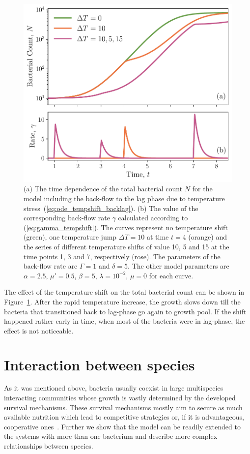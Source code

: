\documentclass[10pt,A4paper]{article}
\numberwithin{equation}{section}
\begin{document}
\begin{figure}[t]
    \begin{center}
    \includegraphics[width=0.9\columnwidth]{Figures/pool_model_3pools_resource_tempshift.pdf}
    \caption{
        (a) The time dependence of the total bacterial count $N$ for the model including the back-flow to the lag phase due to temperature stress~(\ref{eq:ode_tempshift_backlag}).
        (b) The value of the corresponding back-flow rate $\gamma$ calculated according to (\ref{eq:gamma_tempshift}).
        The curves represent no temperature shift (green), one temperature jump $\Delta T = 10$ at time $t=4$ (orange)
        and the series of different temperature shifts of value 10, 5 and 15 at the time points 1, 3 and 7, respectively (rose).
        The parameters of the back-flow rate are $\Gamma=1$ and $\delta=5$.
        The other model parameters are $\alpha=2.5$, $\mu'=0.5$, $\beta=5$, $\lambda=10^{-2}$, $\mu = 0$ for each curve.
    }
    \label{fig:TempJump}
    \end{center}
\end{figure}
The effect of the temperature shift on the total bacterial count can be shown in Figure~\ref{fig:TempJump}.
After the rapid temperature increase, the growth slows down till the bacteria that transitioned back to lag-phase go again to growth pool.
If the shift happened rather early in time, when most of the bacteria were in lag-phase, the effect is not noticeable.
\newpage
%
\section{Interaction between species}
As it was mentioned above, bacteria usually coexist in large multispecies interacting communities whose growth is vastly determined by the developed survival mechanisms.
These survival mechanisms mostly aim to secure as much available nutrition which lead to competitive strategies or, if it is advantageous, cooperative ones~\cite{hibbing_bacterial_2010, stubbendieck_bacterial_2016}.
Further we show that the model can be readily extended to the systems with more than one bacterium and describe more complex relationships between species. 
%
\end{document}
